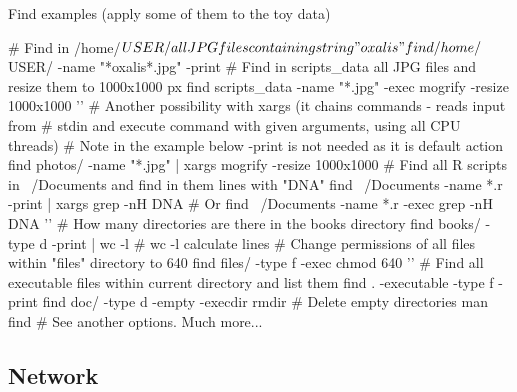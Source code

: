 \documentclass[compress, ucs, xelatex, 11pt, xcolor=svgnames,
  hyperref={
    bookmarks=true,
    unicode=true,
    colorlinks=true,
    pdftitle={Linux, command line and MetaCentrum},
    plainpages=false,
    pdfauthor={Vojtech Zeisek},
    pdfsubject={Course about use of Linux command line, writing shell scripts and using MetaCentrum of CESNET},
    pdfcreator={XeLaTeX},
    pdfkeywords={Linux, GNU, BASH, shell, command line, MetaCentrum},
    linkcolor=DarkRed,
    anchorcolor=DarkBlue,
    citecolor=Indigo,
    filecolor=NavyBlue,
    menucolor=DarkMagenta,
    urlcolor=DarkBlue,
    pdftex},
  url={hyphens, lowtilde} %
  ]{beamer}
\begin{document}
\begin{frame}[fragile]{Find examples (apply some of them to the toy data)}
  \begin{bashcode}
    # Find in /home/$USER/ all JPG files containing string "oxalis"
    find /home/$USER/ -name "*oxalis*.jpg" -print
    # Find in scripts_data all JPG files and resize them to 1000x1000 px
    find scripts_data -name "*.jpg" -exec mogrify -resize 1000x1000 '{}' \;
    # Another possibility with xargs (it chains commands - reads input from
    # stdin and execute command with given arguments, using all CPU threads)
    # Note in the example below -print is not needed as it is default action
    find photos/ -name "*.jpg" | xargs mogrify -resize 1000x1000
    # Find all R scripts in ~/Documents and find in them lines with "DNA"
    find ~/Documents -name *.r -print | xargs grep -nH DNA # Or
    find ~/Documents -name *.r -exec grep -nH DNA '{}' \;
    # How many directories are there in the books directory
    find books/ -type d -print | wc -l # wc -l calculate lines
    # Change permissions of all files within "files" directory to 640
    find files/ -type f -exec chmod 640 '{}' \;
    # Find all executable files within current directory and list them
    find . -executable -type f -print
    find doc/ -type d -empty -execdir rmdir {} \; # Delete empty directories
    man find # See another options. Much more...
  \end{bashcode}
\end{frame}

\subsection{Network}
\end{document}

